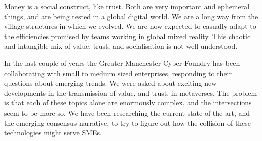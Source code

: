 Money is a social construct, like trust. Both are very important and ephemeral things, and are being tested in a global digital world.  We are a long way from the village structures in which we evolved. We are now expected to casually adapt to the efficiencies promised by teams working in global mixed reality. This chaotic and intangible mix of value, trust, and socialisation is not well understood.\par
In the last couple of years the Greater Manchester Cyber Foundry has been collaborating with small to medium sized enterprises, responding to their questions about emerging trends. We were asked about exciting new developments in the transmission of value, and trust, in metaverses. The problem is that each of these topics alone are enormously complex, and the intersections seem to be more so. We have been researching the current state-of-the-art, and the emerging consensus narrative, to try to figure out how the collision of these technologies might serve SMEs. 


